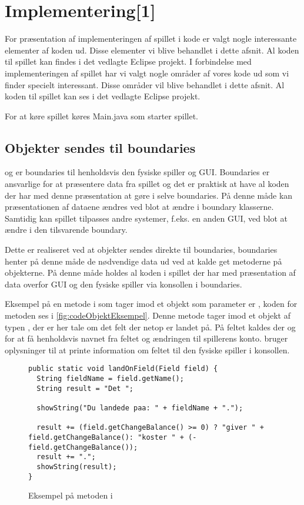 \chapter{Implementering[1]}\label{chap:implementering}
For præsentation af implementeringen af spillet i kode er valgt nogle interessante elementer af koden ud. Disse elementer vi blive behandlet i dette afsnit. Al koden til spillet kan findes i det vedlagte Eclipse projekt. 
I forbindelse med implementeringen af spillet har vi valgt nogle områder af vores kode ud som vi finder specielt interessant. Disse områder vil blive behandlet i dette afsnit. Al koden til spillet kan ses i det vedlagte Eclipse projekt.

For at køre spillet køres Main.java som starter spillet.

\section{Objekter sendes til boundaries} \label{sec:implementering:objektToBoundary}
 og  er boundaries til henholdsvis den fysiske spiller og GUI. Boundaries er ansvarlige for at præsentere data fra spillet og det er praktisk at have al koden der har med denne præsentation at gøre i selve boundaries. På denne måde kan præsentationen af dataene ændres ved blot at ændre i boundary klasserne. Samtidig kan spillet tilpasses andre systemer, f.eks. en anden GUI, ved blot at ændre i den tilsvarende boundary.

Dette er realiseret ved at objekter sendes direkte til boundaries, boundaries henter på denne måde de nødvendige data ud ved at kalde get metoderne på objekterne. På denne måde holdes al koden i spillet der har med præsentation af data overfor GUI og den fysiske spiller via konsollen i boundaries.

Eksempel på en metode i  som tager imod et objekt som parameter er , koden for metoden ses i \vref{fig:codeObjektEksempel}. Denne metode tager imod et objekt af typen , der er her tale om det felt der netop er landet på. På feltet kaldes der  og  for at få henholdsvis navnet fra feltet og ændringen til spillerens konto.  bruger oplysninger til at printe information om feltet til den fysiske spiller i konsollen.

\begin{figure}
\caption{Eksempel på metoden  i }
\label{fig:codeObjektEksempel}
\begin{lstlisting}
public static void landOnField(Field field) {
  String fieldName = field.getName();
  String result = "Det ";

  showString("Du landede paa: " + fieldName + ".");
  
  result += (field.getChangeBalance() >= 0) ? "giver " + field.getChangeBalance(): "koster " + (-field.getChangeBalance());
  result += ".";
  showString(result);
}
\end{lstlisting}
\end{figure}

